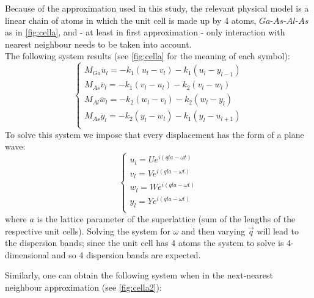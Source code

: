 \documentclass{article}
\begin{document}
Because of the approximation used in this study, the relevant physical model is a linear chain of atoms in which the unit cell is made up by 4 atoms, $Ga$-$As$-$Al$-$As$ as in \autoref{fig:cella}, and - at least in first approximation - only interaction with nearest neighbour needs to be taken into account. \\
The following system results (see \autoref{fig:cella} for the meaning of each symbol):
\begin{equation}
	\begin{cases}
	M_{Ga}\ddot{u_l} = -k_1(u_l-v_l) - k_1(u_l-y_{l-1}) \\
	M_{As}\ddot{v_l} = -k_1(v_l-u_l) - k_2(v_l-w_l) \\
	M_{Al}\ddot{w_l} = -k_2(w_l-v_l) - k_2(w_l-y_l) \\
	M_{As}\ddot{y_l} = -k_2(y_l-w_l) - k_1(y_l-u_{l+1}) \\
	\end{cases}
	\label{eq:sistema}	
\end{equation}
To solve this system we impose that every displacement has the form of a plane wave:
\begin{equation}
	\begin{cases}
	u_l = Ue^{i(qla-\omega t)} \\
	v_l = Ve^{i(qla-\omega t)} \\
	w_l = We^{i(qla-\omega t)} \\
	y_l = Ye^{i(qla-\omega t)} \\
	\end{cases}
	\label{eq:onde piane}
\end{equation}
where $a$ is the lattice parameter of the superlattice (sum of the lengths of the respective unit cells).
Solving the system for $\omega$ and then varying $\vec{q}$ will lead to the dispersion bands; since the unit cell has 4 atoms the system to solve is 4-dimensional and so 4 dispersion bands are expected. \par


Similarly, one can obtain the following system when in the next-nearest neighbour approximation (see \autoref{fig:cella2}):
\end{document}
